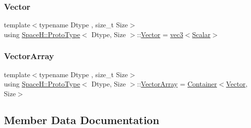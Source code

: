\mbox{\label{struct_space_h_1_1_proto_type_a316b81f4660b2b4fab14a8e1f23b6089}} 
\subsubsection{\texorpdfstring{Vector}{Vector}}
{\footnotesize\ttfamily template$<$typename Dtype , size\+\_\+t Size$>$ \\
using \mbox{\hyperlink{struct_space_h_1_1_proto_type}{Space\+H\+::\+Proto\+Type}}$<$ Dtype, Size $>$\+::\mbox{\hyperlink{struct_space_h_1_1_proto_type_a316b81f4660b2b4fab14a8e1f23b6089}{Vector}} =  \mbox{\hyperlink{struct_space_h_1_1vec3}{vec3}}$<$\mbox{\hyperlink{struct_space_h_1_1_proto_type_af3c8245d83d9db64749882920de5c274}{Scalar}}$>$}

\mbox{\label{struct_space_h_1_1_proto_type_a622b8e122b33bb4966a02299fb7b82d6}} 
\subsubsection{\texorpdfstring{Vector\+Array}{VectorArray}}
{\footnotesize\ttfamily template$<$typename Dtype , size\+\_\+t Size$>$ \\
using \mbox{\hyperlink{struct_space_h_1_1_proto_type}{Space\+H\+::\+Proto\+Type}}$<$ Dtype, Size $>$\+::\mbox{\hyperlink{struct_space_h_1_1_proto_type_a622b8e122b33bb4966a02299fb7b82d6}{Vector\+Array}} =  \mbox{\hyperlink{struct_space_h_1_1_proto_type_a60ee86c74f6f9ebfa78936f6dc1d2b07}{Container}}$<$\mbox{\hyperlink{struct_space_h_1_1_proto_type_a316b81f4660b2b4fab14a8e1f23b6089}{Vector}}, Size$>$}



\subsection{Member Data Documentation}
\mbox{\label{struct_space_h_1_1_proto_type_a52e6df98534a97aa207f4447abd14d3c}} 

